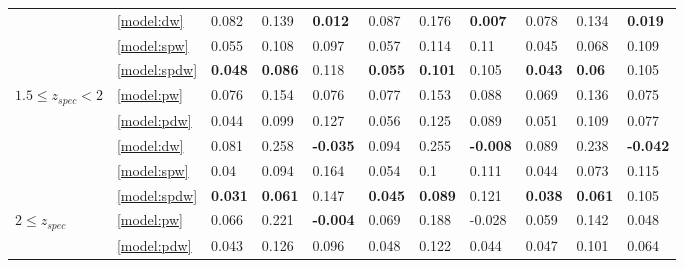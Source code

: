 \documentclass[fleqn,usenatbib]{mnras}
\begin{document}
\begin{table}
\begin{tabular}{lllllllllll}
                              & \ref{model:dw} &                0.082 &           0.139 &   \textbf{0.012} &            0.087 &           0.176 &   \textbf{0.007} &            0.078 &           0.134 &   \textbf{0.019} \\
                              & \ref{model:spw} &                0.055 &           0.108 &            0.097 &            0.057 &           0.114 &             0.11 &            0.045 &           0.068 &            0.109 \\
                              & \ref{model:spdw} &       \textbf{0.048} &  \textbf{0.086} &            0.118 &   \textbf{0.055} &  \textbf{0.101} &            0.105 &   \textbf{0.043} &   \textbf{0.06} &            0.105 \\
\hline
            $1.5 \leq z_{spec} < 2$ & \ref{model:pw} &                0.076 &           0.154 &            0.076 &            0.077 &           0.153 &            0.088 &            0.069 &           0.136 &            0.075 \\
                              & \ref{model:pdw} &                0.044 &           0.099 &            0.127 &            0.056 &           0.125 &            0.089 &            0.051 &           0.109 &            0.077 \\
                              & \ref{model:dw} &                0.081 &           0.258 &  \textbf{-0.035} &            0.094 &           0.255 &  \textbf{-0.008} &            0.089 &           0.238 &  \textbf{-0.042} \\
                              & \ref{model:spw} &                 0.04 &           0.094 &            0.164 &            0.054 &             0.1 &            0.111 &            0.044 &           0.073 &            0.115 \\
                              & \ref{model:spdw} &       \textbf{0.031} &  \textbf{0.061} &            0.147 &   \textbf{0.045} &  \textbf{0.089} &            0.121 &   \textbf{0.038} &  \textbf{0.061} &            0.105 \\
\hline
            $2 \leq z_{spec}$ & \ref{model:pw} &                0.066 &           0.221 &  \textbf{-0.004} &            0.069 &           0.188 &           -0.028 &            0.059 &           0.142 &            0.048 \\
                              & \ref{model:pdw} &                0.043 &           0.126 &            0.096 &            0.048 &           0.122 &            0.044 &            0.047 &           0.101 &            0.064 \\

\end{tabular}
\end{table}
\end{document}
